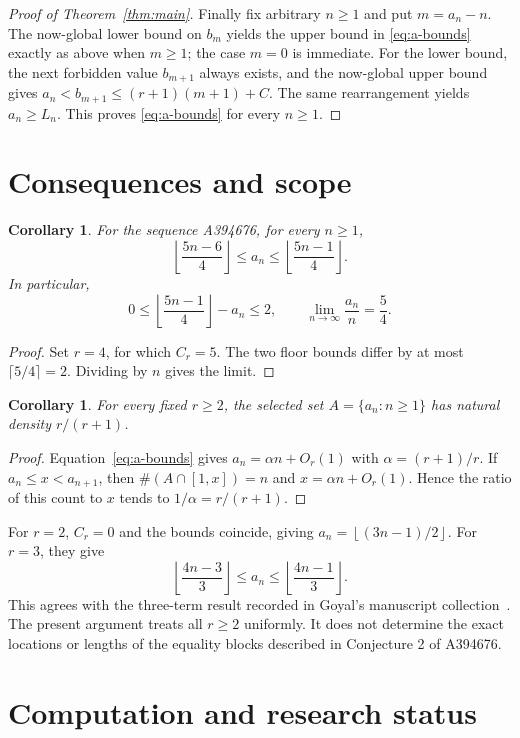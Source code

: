 \documentclass[11pt]{article}
\newtheorem{corollary}[theorem]{Corollary}
\theoremstyle{remark}
\newcommand{\floor}[1]{\left\lfloor #1\right\rfloor}
\begin{document}
\begin{proof}[Proof of Theorem~\ref{thm:main}]
Finally fix arbitrary $n\ge1$ and put $m=a_n-n$. The now-global lower
bound on $b_m$ yields the upper bound in \eqref{eq:a-bounds} exactly as
above when $m\ge1$; the case $m=0$ is immediate. For the lower bound, the
next forbidden value $b_{m+1}$ always exists, and the now-global upper bound
gives $a_n<b_{m+1}\le(r+1)(m+1)+C$. The same rearrangement yields
$a_n\ge L_n$. This proves \eqref{eq:a-bounds} for every $n\ge1$.
\end{proof}

\section{Consequences and scope}

\begin{corollary}\label{cor:four}
For the sequence A394676, for every $n\ge1$,
\[
\boxed{\floor{\frac{5n-6}{4}}\le a_n\le\floor{\frac{5n-1}{4}}.}
\]
In particular,
\[
0\le\floor{\frac{5n-1}{4}}-a_n\le2,
\qquad
\lim_{n\to\infty}\frac{a_n}{n}=\frac54.
\]
\end{corollary}
\begin{proof}
Set $r=4$, for which $C_r=5$. The two floor bounds differ by at most
$\lceil5/4\rceil=2$. Dividing by $n$ gives the limit.
\end{proof}

\begin{corollary}
For every fixed $r\ge2$, the selected set $A=\{a_n:n\ge1\}$ has natural
density $r/(r+1)$.
\end{corollary}
\begin{proof}
Equation~\eqref{eq:a-bounds} gives $a_n=\alpha n+O_r(1)$ with
$\alpha=(r+1)/r$. If $a_n\le x<a_{n+1}$, then
$\#(A\cap[1,x])=n$ and $x=\alpha n+O_r(1)$. Hence the ratio of this count
to $x$ tends to $1/\alpha=r/(r+1)$.
\end{proof}

For $r=2$, $C_r=0$ and the bounds coincide, giving
$a_n=\floor{(3n-1)/2}$. For $r=3$, they give
\[
\floor{\frac{4n-3}{3}}\le a_n\le\floor{\frac{4n-1}{3}}.
\]
This agrees with the three-term result recorded in Goyal's manuscript
collection~\cite{goyal}. The present argument treats all $r\ge2$ uniformly.
It does not determine the exact locations or lengths of the equality blocks
described in Conjecture 2 of A394676.

\section{Computation and research status}
\end{document}
